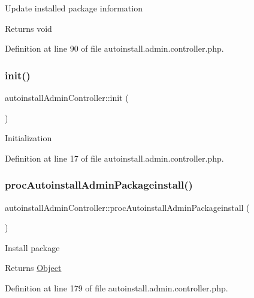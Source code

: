 Update installed package information

\begin{DoxyReturn}{Returns}
void 
\end{DoxyReturn}


Definition at line 90 of file autoinstall.\+admin.\+controller.\+php.

\mbox{\label{classautoinstallAdminController_a0679d301d4f5cf35d76a62c4c7584828}} 
\subsubsection{\texorpdfstring{init()}{init()}}
{\footnotesize\ttfamily autoinstall\+Admin\+Controller\+::init (\begin{DoxyParamCaption}{ }\end{DoxyParamCaption})}

Initialization 

Definition at line 17 of file autoinstall.\+admin.\+controller.\+php.

\mbox{\label{classautoinstallAdminController_af38130de594cfb4f33b6812a6a9f874d}} 
\subsubsection{\texorpdfstring{proc\+Autoinstall\+Admin\+Packageinstall()}{procAutoinstallAdminPackageinstall()}}
{\footnotesize\ttfamily autoinstall\+Admin\+Controller\+::proc\+Autoinstall\+Admin\+Packageinstall (\begin{DoxyParamCaption}{ }\end{DoxyParamCaption})}

Install package

\begin{DoxyReturn}{Returns}
\hyperlink{classObject}{Object} 
\end{DoxyReturn}


Definition at line 179 of file autoinstall.\+admin.\+controller.\+php.

